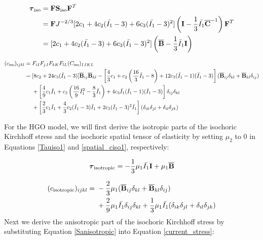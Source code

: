 \begin{appendices}
\begin{strip}
\begin{equation} \label{Tauiso2}
\begin{split}
\boldsymbol{\tau}_\mathrm{iso} 
&= \bold{F}\bold{S}_\mathrm{iso}{\bold{F}}^T \\
&= \bold{F}  J^{-2/3}[2c_1 + 4c_2(\bar{I_1} - 3) + 6c_3(\bar{I_1} - 3)^2] \left(\bold{I} - \frac{1}{3}\bar{I_1}{\overline{\bold{C}}}^{-1} \right)  \bold{F}^T \\
&= [2c_1 + 4c_2(\bar{I_1} - 3) + 6c_3(\bar{I_1} - 3)^2] \left(\overline{\bold{B}} - \frac{1}{3}\bar{I}_1\bold{I} \right)
\end{split}
\end{equation}
\end{strip}
\begin{strip}
\begin{equation} \label{spatial_ciso2}
\begin{split}
(c_\mathrm{iso})_{ijkl} = {} &  F_{iI}F_{jJ}F_{kK}F_{lL}(C_\mathrm{iso})_{IJKL} \\
= {}& 
[8c_2+24c_3({\bar{I}}_1 - 3)] {\overline{\bold{B}}}_{ij}{\overline{\bold{B}}}_{kl} 
- \left[\frac{4}{3}c_1 + c_2\left(\frac{16}{3}{\bar{I}}_1 - 8\right) + 12c_3({\bar{I}}_1 - 1)({\bar{I}}_1 - 3)\right]({\overline{\bold{B}}}_{ij}\delta_{kl} + {\overline{\bold{B}}}_{kl}\delta_{ij}) \\
&+ \left[\frac{4}{9}c_1{\bar{I}}_1 + c_2\left(\frac{16}{9}{{\bar{I}}_1}^2 - \frac{8}{3}{\bar{I}}_1\right) + 4c_3{\bar{I}}_1({\bar{I}}_1 - 1)({\bar{I}}_1 - 3)\right] \delta_{ij}\delta_{kl} \\
&+ \left[\frac{2}{3}c_1{\bar{I}}_1 + \frac{4}{3}c_2({\bar{I}}_1 - 3){\bar{I}}_1 + 2c_3({\bar{I}}_1 - 3)^2{\bar{I}}_1\right](\delta_{ik}\delta_{jl} + \delta_{il}\delta_{jk})
\end{split}
\end{equation}
\end{strip}
For the HGO model, we will first derive the isotropic parts of the isochoric Kirchhoff stress and the isochoric spatial tensor of elasticity by setting $\mu_2$ to $0$ in Equations \ref{Tauiso1} and \ref{spatial_ciso1}, respectively:

\begin{equation} \label{Tauisotropic}
\boldsymbol{\tau}_\mathrm{isotropic} = - \frac{1}{3}\mu_1\bar{I_1}\bold{I} + \mu_1{\overline{\bold{B}}}
\end{equation}

\begin{equation} \label{spatial_cisotropic}
\begin{split}
(c_\mathrm{isotropic})_{ijkl} 
= {} &- \frac{2}{3}\mu_1({\overline{\bold{B}}}_{ij}\delta_{kl} + {\overline{\bold{B}}}_{kl}\delta_{ij}) \\
&+ \frac{2}{9}\mu_1\bar{I_1}  \delta_{ij}\delta_{kl}
+ \frac{1}{3}\mu_1\bar{I_1} (\delta_{ik}\delta_{jl} + \delta_{il}\delta_{jk})
\end{split}
\end{equation} 
Next we derive the anisotropic part of the isochoric Kirchhoff stress by substituting Equation \ref{Sanisotropic} into Equation \ref{current_stress}:


\end{appendices}
